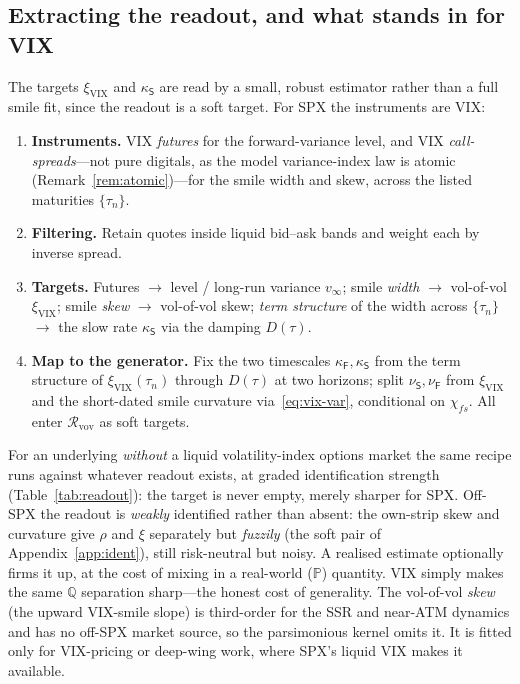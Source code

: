 \documentclass[11pt]{article}
\newcommand{\cR}{\mathcal{R}}
\newcommand{\VIX}{\mathrm{VIX}}
\begin{document}
\subsection{Extracting the readout, and what stands in for VIX}
The targets $\xi_{\VIX}$ and $\kappa_{\mathsf{S}}$ are read by a small, robust estimator rather than a
full smile fit, since the readout is a soft target. For SPX the instruments are VIX:
\begin{enumerate}
  \item \textbf{Instruments.} VIX \emph{futures} for the forward-variance level, and
    VIX \emph{call-spreads}---not pure digitals, as the model variance-index law is atomic
    (Remark~\ref{rem:atomic})---for the smile width and skew, across the listed
    maturities $\{\tau_n\}$.
  \item \textbf{Filtering.} Retain quotes inside liquid bid--ask bands and weight each
    by inverse spread.
  \item \textbf{Targets.} Futures $\to$ level / long-run variance $v_\infty$; smile
    \emph{width} $\to$ vol-of-vol $\xi_{\VIX}$; smile \emph{skew} $\to$
    vol-of-vol skew; \emph{term structure} of the width across $\{\tau_n\}$ $\to$ the
    slow rate $\kappa_{\mathsf{S}}$ via the damping $D(\tau)$.
  \item \textbf{Map to the generator.} Fix the two timescales $\kappa_{\mathsf{F}},\kappa_{\mathsf{S}}$ from the term structure of
    $\xi_{\VIX}(\tau_n)$ through $D(\tau)$ at two horizons; split $\nu_{\mathsf{S}},\nu_{\mathsf{F}}$ from
    $\xi_{\VIX}$ and the short-dated smile curvature
    via~\eqref{eq:vix-var}, conditional on $\chi_{fs}$. All enter
    $\cR_{\mathrm{vov}}$ as soft targets.
\end{enumerate}

For an underlying \emph{without} a liquid volatility-index options market the same recipe runs
against whatever readout exists, at graded identification strength (Table~\ref{tab:readout}):
the target is never empty, merely sharper for SPX. Off-SPX the readout is \emph{weakly}
identified rather than absent: the own-strip skew and
curvature give $\rho$ and $\xi$ separately but \emph{fuzzily} (the soft pair of
Appendix~\ref{app:ident}), still risk-neutral but noisy. A realised estimate optionally
firms it up, at the cost of mixing in a real-world ($\mathbb P$) quantity. VIX simply makes
the same $\mathbb Q$ separation sharp---the honest cost of generality. The vol-of-vol \emph{skew} (the upward VIX-smile slope) is third-order for the
SSR and near-ATM dynamics and has no off-SPX market source, so the parsimonious kernel omits it. It is fitted only for VIX-pricing or deep-wing work, where SPX's liquid VIX makes it
available.
\end{document}
